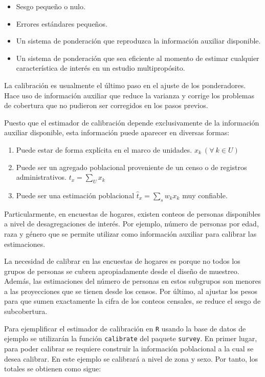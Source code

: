 \documentclass[
  spanish,
  12pt,
]{book}
\providecommand{\tightlist}{%
  \setlength{\itemsep}{0pt}\setlength{\parskip}{0pt}}
\begin{document}
\begin{itemize}
\tightlist
\item
  Sesgo pequeño o nulo.
\item
  Errores estándares pequeños.
\item
  Un sistema de ponderación que reproduzca la información auxiliar disponible.
\item
  Un sistema de ponderación que sea eficiente al momento de estimar cualquier característica de interés en un estudio multipropósito.
\end{itemize}

La calibración es usualmente el último paso en el ajuste de los ponderadores. Hace uso de información auxiliar que reduce la varianza y corrige los problemas de cobertura que no pudieron ser corregidos en los pasos previos.

Puesto que el estimador de calibración depende exclusivamente de la información auxiliar disponible, esta información puede aparecer en diversas formas:

\begin{enumerate}
\def\labelenumi{\arabic{enumi}.}
\item
  Puede estar de forma explícita en el marco de unidades. \(x_k \ (\forall \ k \in U)\)
\item
  Puede ser un agregado poblacional proveniente de un censo o de registros administrativos. \(t_x = \sum_U x_k\)
\item
  Puede ser una estimación poblacional \(\hat{t}_x = \sum_s w_kx_k\) muy confiable.
\end{enumerate}

Particularmente, en encuestas de hogares, existen conteos de personas disponibles a nivel de desagregaciones de interés. Por ejemplo, número de personas por edad, raza y género que se permite utilizar como información auxiliar para calibrar las estimaciones.

La necesidad de calibrar en las encuestas de hogares es porque no todos los grupos de personas se cubren apropiadamente desde el diseño de muestreo. Además, las estimaciones del número de personas en estos subgrupos son menores a las proyecciones que se tienen desde los censos. Por último, al ajustar los pesos para que sumen exactamente la cifra de los conteos censales, se reduce el sesgo de subcobertura.

Para ejemplificar el estimador de calibración en \texttt{R} usando la base de datos de ejemplo se utilizarán la función \texttt{calibrate} del paquete \texttt{survey}. En primer lugar, para poder calibrar se requiere construir la información poblacional a la cual se desea calibrar. En este ejemplo se calibrará a nivel de zona y sexo. Por tanto, los totales se obtienen como sigue:
\end{document}

